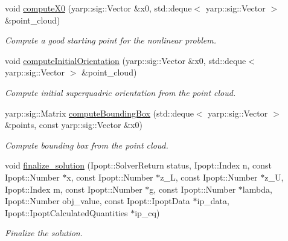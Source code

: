 \begin{DoxyCompactItemize}
void \hyperlink{classSuperQuadric__NLP_a7395729e42b83d083b88451620ede9c6}{compute\-X0} (yarp\-::sig\-::\-Vector \&x0, std\-::deque$<$ yarp\-::sig\-::\-Vector $>$ \&point\-\_\-cloud)
\begin{DoxyCompactList}\small\item\em Compute a good starting point for the nonlinear problem. \end{DoxyCompactList}\item 
void \hyperlink{classSuperQuadric__NLP_a6fd9bdffb81bfdfec56bae2efd58c270}{compute\-Initial\-Orientation} (yarp\-::sig\-::\-Vector \&x0, std\-::deque$<$ yarp\-::sig\-::\-Vector $>$ \&point\-\_\-cloud)
\begin{DoxyCompactList}\small\item\em Compute initial superquadric orientation from the point cloud. \end{DoxyCompactList}\item 
yarp\-::sig\-::\-Matrix \hyperlink{classSuperQuadric__NLP_a425745a725c4f0dba398a6b5389809a7}{compute\-Bounding\-Box} (std\-::deque$<$ yarp\-::sig\-::\-Vector $>$ \&points, const yarp\-::sig\-::\-Vector \&x0)
\begin{DoxyCompactList}\small\item\em Compute bounding box from the point cloud. \end{DoxyCompactList}\item 
void \hyperlink{classSuperQuadric__NLP_a2f0b1fc45d42b0ee77c343ea7c227874}{finalize\-\_\-solution} (Ipopt\-::\-Solver\-Return status, Ipopt\-::\-Index n, const Ipopt\-::\-Number $\ast$x, const Ipopt\-::\-Number $\ast$z\-\_\-\-L, const Ipopt\-::\-Number $\ast$z\-\_\-\-U, Ipopt\-::\-Index m, const Ipopt\-::\-Number $\ast$g, const Ipopt\-::\-Number $\ast$lambda, Ipopt\-::\-Number obj\-\_\-value, const Ipopt\-::\-Ipopt\-Data $\ast$ip\-\_\-data, Ipopt\-::\-Ipopt\-Calculated\-Quantities $\ast$ip\-\_\-cq)
\begin{DoxyCompactList}\small\item\em Finalize the solution. \end{DoxyCompactList}\end{DoxyCompactItemize}
